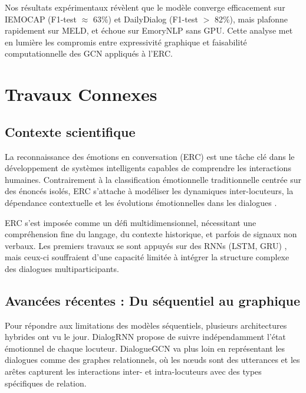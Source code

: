 \documentclass[a4paper,11pt]{article}
\begin{document}
Nos résultats expérimentaux révèlent que le modèle converge efficacement sur IEMOCAP (F1-test $\approx$ 63\%) et DailyDialog (F1-test $>$ 82\%), mais plafonne rapidement sur MELD, et échoue sur EmoryNLP sans GPU. Cette analyse met en lumière les compromis entre expressivité graphique et faisabilité computationnelle des GCN appliqués à l’ERC.

\newpage






\section{Travaux Connexes}

\subsection{Contexte scientifique}
La reconnaissance des émotions en conversation (ERC) est une tâche clé dans le développement de systèmes intelligents capables de comprendre les interactions humaines. Contrairement à la classification émotionnelle traditionnelle centrée sur des énoncés isolés, ERC s'attache à modéliser les dynamiques inter-locuteurs, la dépendance contextuelle et les évolutions émotionnelles dans les dialogues \cite{poria2019emotion,majumder2019dialoguernn}.

ERC s'est imposée comme un défi multidimensionnel, nécessitant une compréhension fine du langage, du contexte historique, et parfois de signaux non verbaux. Les premiers travaux se sont appuyés sur des RNNs (LSTM, GRU) \cite{poria2017context}, mais ceux-ci souffraient d'une capacité limitée à intégrer la structure complexe des dialogues multiparticipants.

\subsection{Avancées récentes : Du séquentiel au graphique}
Pour répondre aux limitations des modèles séquentiels, plusieurs architectures hybrides ont vu le jour. DialogRNN \cite{majumder2019dialoguernn} propose de suivre indépendamment l'état émotionnel de chaque locuteur. DialogueGCN \cite{ghosal2019dialoguegcn} va plus loin en représentant les dialogues comme des graphes relationnels, où les nœuds sont des utterances et les arêtes capturent les interactions inter- et intra-locuteurs avec des types spécifiques de relation.
\end{document}
